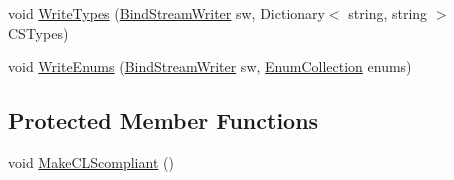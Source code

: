 \begin{DoxyCompactItemize}
\item 
void \hyperlink{class_bind_1_1_g_l2_1_1_generator_ac85aa3a64d16f841941edc1d57366d2b}{WriteTypes} (\hyperlink{class_bind_1_1_bind_stream_writer}{BindStreamWriter} sw, Dictionary$<$ string, string $>$ CSTypes)
\item 
void \hyperlink{class_bind_1_1_g_l2_1_1_generator_a5c03931896b1e2d1af630e7df214afd5}{WriteEnums} (\hyperlink{class_bind_1_1_bind_stream_writer}{BindStreamWriter} sw, \hyperlink{class_bind_1_1_structures_1_1_enum_collection}{EnumCollection} enums)
\end{DoxyCompactItemize}
\subsection*{Protected Member Functions}
\begin{DoxyCompactItemize}
\item 
void \hyperlink{class_bind_1_1_g_l2_1_1_generator_a4366a5f5218a8b88108efe14eeadc563}{MakeCLScompliant} ()
\end{DoxyCompactItemize}
